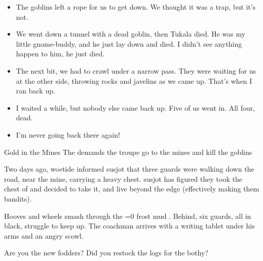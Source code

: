 \begin{multicols}{2}
\begin{speechtext}
\begin{itemize}
    \item
    The goblins left a rope for us to get down.
    We thought it was a trap, but it's not.
    
    \item
    We went down a tunnel with a dead goblin, then Tukala died.
    He was my little gnome-buddy, and he just lay down and died.
    I didn't see anything happen to him, he just died.
    
    \item
    The next bit, we had to crawl under a narrow pass.
    They were waiting for us at the other side, throwing rocks and javelins as we came up.
    That's when I ran back up.
    
    \item
    I waited a while, but nobody else came back up.
    Five of us went in.
    All four, dead.
    \item
    I'm never going back there again!
  \end{itemize}
\end{speechtext}

{Gold in the Mines}%
{The  demands the troupe go to the mines and kill the goblins}%

\begin{exampletext}
  Two days ago, \gls{woetide} informed \gls{susjot} that three \glspl{guard} were walking down the road, near the mine, carrying a heavy chest.
  \Gls{susjot} has figured they took the chest of  and decided to take it, and live beyond the \gls{edge} (effectively making them bandits).
\end{exampletext}

\begin{boxtext}
  Hooves and wheels smash through the
  \ifnum\value{temperature}=0%
    frost
  \else%
    mud
  \fi.
  Behind, six \glspl{guard}, all in black, struggle to keep up.
  The coachman arrives with a writing tablet under his arms and an angry scowl.
  \begin{speechtext}
      Are you the new \glspl{fodder}?
      Did you restock the logs for the \gls{bothy}?
  \end{speechtext}
\end{boxtext}


\end{multicols}

